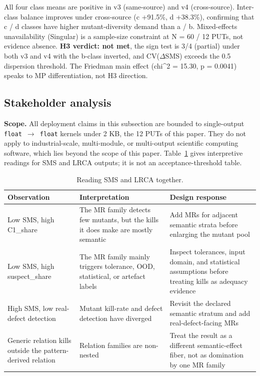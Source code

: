 \documentclass[acmsmall,screen,review]{acmart}
\begin{document}
All four class means are positive in v3 (same-source) and v4
(cross-source). Inter-class balance improves under cross-source (c
+91.5\%, d +38.3\%), confirming that c / d classes have higher
mutant-diversity demand than a / b. Mixed-effects unavailability
(Singular) is a sample-size constraint at N = 60 / 12 PUTs, not evidence
absence. \textbf{H3 verdict: not met}, the sign test is 3/4 (partial)
under both v3 and v4 with the b-class inverted, and CV($\Delta$SMS)
exceeds the 0.5 dispersion threshold. The Friedman main effect (chi\^{}2 =
15.30, p = 0.0041) speaks to MP differentiation, not H3 direction.

\subsection{Stakeholder analysis}\label{stakeholder-analysis-single-output-kernels-scope}

\textbf{Scope.} All deployment claims in this subsection are bounded to
single-output \texttt{float\ $\to$\ float} kernels under 2 KB, the 12 PUTs
of this paper. They do not apply to industrial-scale, multi-module, or
multi-output scientific computing software, which lies beyond the scope of this paper.
Table~\ref{tab:sms-lrca-reading} gives interpretive readings for SMS and
LRCA outputs; it is not an acceptance-threshold table.

{\def\LTcaptype{table} %
\begin{longtable}[]{@{}
  >{\raggedright\arraybackslash}p{}
  >{\raggedright\arraybackslash}p{}
  >{\raggedright\arraybackslash}p{}@{}}
\caption{Reading SMS and LRCA together.}\label{tab:sms-lrca-reading}\\
\toprule\noalign{}
Observation & Interpretation & Design response \\
\midrule\noalign{}
\endfirsthead
\endhead
\bottomrule\noalign{}
\endlastfoot
Low SMS, high C1\_share & The MR family detects few mutants, but the
kills it does make are mostly semantic & Add MRs for adjacent semantic
strata before enlarging the mutant pool \\
Low SMS, high suspect\_share & The MR family mainly triggers tolerance,
OOD, statistical, or artefact labels & Inspect tolerances, input domain,
and statistical assumptions before treating kills as adequacy evidence \\
High SMS, low real-defect detection & Mutant kill-rate and defect
detection have diverged & Revisit the declared semantic stratum and add
real-defect-facing MRs \\
Generic relation kills outside the pattern-derived relation & Relation
families are non-nested & Treat the result as a different
semantic-effect fiber, not as domination by one MR family \\
\end{longtable}
}
\end{document}
